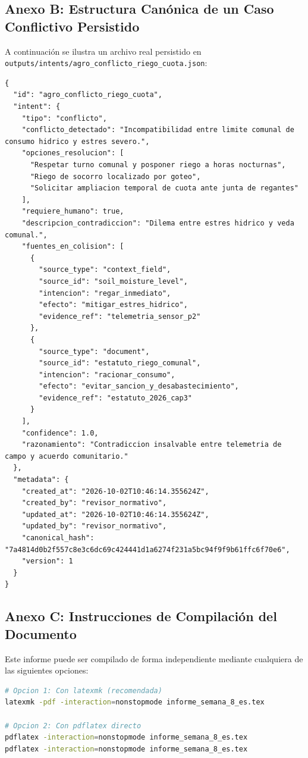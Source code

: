 \documentclass[11pt,a4paper]{article}
\begin{document}
\subsection{Anexo B: Estructura Canónica de un Caso Conflictivo Persistido}
A continuación se ilustra un archivo real persistido en \texttt{outputs/intents/agro\_conflicto\_riego\_cuota.json}:
\begin{lstlisting}[basicstyle=\ttfamily\scriptsize]
{
  "id": "agro_conflicto_riego_cuota",
  "intent": {
    "tipo": "conflicto",
    "conflicto_detectado": "Incompatibilidad entre limite comunal de consumo hidrico y estres severo.",
    "opciones_resolucion": [
      "Respetar turno comunal y posponer riego a horas nocturnas",
      "Riego de socorro localizado por goteo",
      "Solicitar ampliacion temporal de cuota ante junta de regantes"
    ],
    "requiere_humano": true,
    "descripcion_contradiccion": "Dilema entre estres hidrico y veda comunal.",
    "fuentes_en_colision": [
      {
        "source_type": "context_field",
        "source_id": "soil_moisture_level",
        "intencion": "regar_inmediato",
        "efecto": "mitigar_estres_hidrico",
        "evidence_ref": "telemetria_sensor_p2"
      },
      {
        "source_type": "document",
        "source_id": "estatuto_riego_comunal",
        "intencion": "racionar_consumo",
        "efecto": "evitar_sancion_y_desabastecimiento",
        "evidence_ref": "estatuto_2026_cap3"
      }
    ],
    "confidence": 1.0,
    "razonamiento": "Contradiccion insalvable entre telemetria de campo y acuerdo comunitario."
  },
  "metadata": {
    "created_at": "2026-10-02T10:46:14.355624Z",
    "created_by": "revisor_normativo",
    "updated_at": "2026-10-02T10:46:14.355624Z",
    "updated_by": "revisor_normativo",
    "canonical_hash": "7a4814d0b2f557c8e3c6dc69c424441d1a6274f231a5bc94f9f9b61ffc6f70e6",
    "version": 1
  }
}
\end{lstlisting}

\subsection{Anexo C: Instrucciones de Compilación del Documento}
Este informe puede ser compilado de forma independiente mediante cualquiera de las siguientes opciones:
\begin{lstlisting}[language=bash]
# Opcion 1: Con latexmk (recomendada)
latexmk -pdf -interaction=nonstopmode informe_semana_8_es.tex

# Opcion 2: Con pdflatex directo
pdflatex -interaction=nonstopmode informe_semana_8_es.tex
pdflatex -interaction=nonstopmode informe_semana_8_es.tex
\end{lstlisting}
\end{document}
